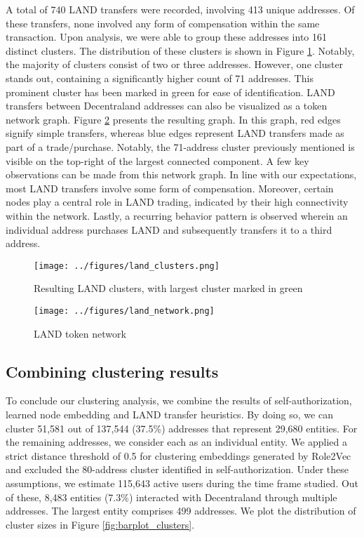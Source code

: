 \documentclass[12pt,a4paper,titlepage,oneside,english]{article}
\begin{document}
A total of 740 LAND transfers were recorded, involving 413 unique addresses. Of these transfers, none involved any form of compensation within the same transaction. Upon analysis, we were able to group these addresses into 161 distinct clusters. The distribution of these clusters is shown in Figure \ref{fig:LAND_clusters}. Notably, the majority of clusters consist of two or three addresses. However, one cluster stands out, containing a significantly higher count of 71 addresses. This prominent cluster has been marked in green for ease of identification. \newline
LAND transfers between Decentraland addresses can also be visualized as a token network graph. Figure \ref{fig:LAND_network} presents the resulting graph. In this graph, red edges signify simple transfers, whereas blue edges represent LAND transfers made as part of a trade/purchase. Notably, the 71-address cluster previously mentioned is visible on the top-right of the largest connected component. \newline
A few key observations can be made from this network graph. In line with our expectations, most LAND transfers involve some form of compensation. Moreover, certain nodes play a central role in LAND trading, indicated by their high connectivity within the network. Lastly, a recurring behavior pattern is observed wherein an individual address purchases LAND and subsequently transfers it to a third address. %

\begin{figure}[h]
	\centering
	\texttt{[image: ../figures/land\_clusters.png]}
	\caption{Resulting LAND clusters, with largest cluster marked in green}
	\label{fig:LAND_clusters}
\end{figure}

\begin{figure}[h]
	\centering
	\texttt{[image: ../figures/land\_network.png]}
	\caption{LAND token network}
	\label{fig:LAND_network}
\end{figure} 

\subsection{Combining clustering results}

To conclude our clustering analysis, we combine the results of self-authorization, learned node embedding and LAND transfer heuristics. By doing so, we can cluster 51,581 out of 137,544 (37.5\%) addresses that represent 29,680 entities. 
For the remaining addresses, we consider each as an individual entity. 
We applied a strict distance threshold of 0.5 for clustering embeddings generated by Role2Vec and excluded the 80-address cluster identified in self-authorization.
Under these assumptions, we estimate 115,643 active users during the time frame studied. Out of these, 8,483 entities (7.3\%) interacted with Decentraland through multiple addresses. The largest entity comprises 499 addresses. We plot the distribution of cluster sizes in Figure \ref{fig:barplot_clusters}.
\end{document}
